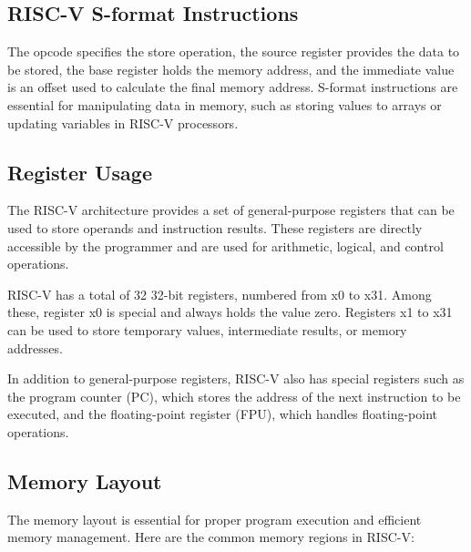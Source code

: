         \subsection{RISC-V S-format Instructions}

            The opcode specifies the store operation, the source register provides the data to be stored, the base register holds the memory address, and the immediate value is an offset used to calculate the final memory address. S-format instructions are essential for manipulating data in memory, such as storing values to arrays or updating variables in RISC-V processors.
        
        \subsection{Register Usage}

            The RISC-V architecture provides a set of general-purpose registers that can be used to store operands and instruction results. These registers are directly accessible by the programmer and are used for arithmetic, logical, and control operations.
            
            RISC-V has a total of 32 32-bit registers, numbered from x0 to x31. Among these, register x0 is special and always holds the value zero. Registers x1 to x31 can be used to store temporary values, intermediate results, or memory addresses.
                    
            In addition to general-purpose registers, RISC-V also has special registers such as the program counter (PC), which stores the address of the next instruction to be executed, and the floating-point register (FPU), which handles floating-point operations. 

        \subsection{Memory Layout}
            
            The memory layout is essential for proper program execution and efficient memory management. Here are the common memory regions in RISC-V:
            
